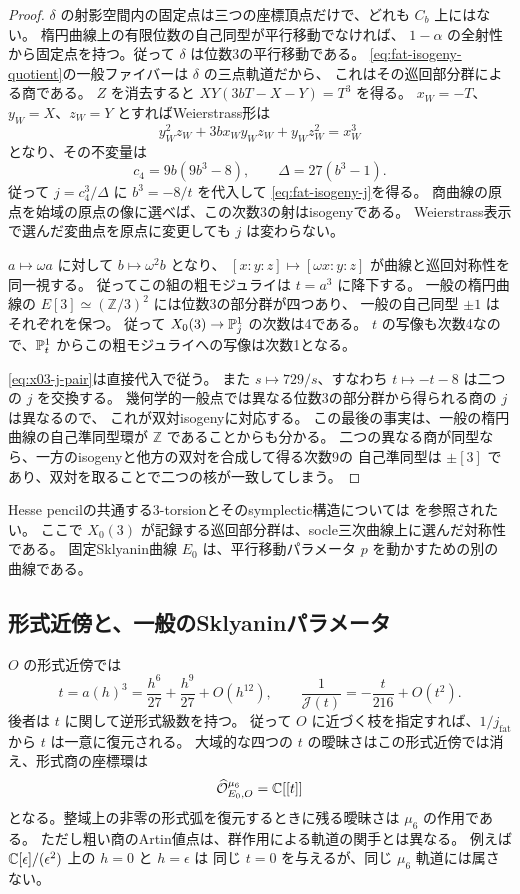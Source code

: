 \begin{proof}
$\delta$ の射影空間内の固定点は三つの座標頂点だけで、どれも $C_b$ 上にはない。
楕円曲線上の有限位数の自己同型が平行移動でなければ、
$1-\alpha$ の全射性から固定点を持つ。従って $\delta$ は位数3の平行移動である。
\eqref{eq:fat-isogeny-quotient}の一般ファイバーは $\delta$ の三点軌道だから、
これはその巡回部分群による商である。
$Z$ を消去すると $XY(3bT-X-Y)=T^3$ を得る。
$x_W=-T$、$y_W=X$、$z_W=Y$ とすればWeierstrass形は
\[
 y_W^2z_W+3b x_Wy_Wz_W+y_Wz_W^2=x_W^3
\]
となり、その不変量は
\[
 c_4=9b(9b^3-8),\qquad\Delta=27(b^3-1).
\]
従って $j=c_4^3/\Delta$ に $b^3=-8/t$ を代入して
\eqref{eq:fat-isogeny-j}を得る。
商曲線の原点を始域の原点の像に選べば、この次数3の射はisogenyである。
Weierstrass表示で選んだ変曲点を原点に変更しても $j$ は変わらない。

$a\mapsto\omega a$ に対して $b\mapsto\omega^2b$ となり、
$[x:y:z]\mapsto[\omega x:y:z]$ が曲線と巡回対称性を同一視する。
従ってこの組の粗モジュライは $t=a^3$ に降下する。
一般の楕円曲線の $E[3]\simeq(\mathbb Z/3)^2$ には位数3の部分群が四つあり、
一般の自己同型 $\pm1$ はそれぞれを保つ。
従って $X_0(3)\to\mathbb P^1_j$ の次数は4である。
$t$ の写像も次数4なので、$\mathbb P^1_t$ からこの粗モジュライへの写像は次数1となる。

\eqref{eq:x03-j-pair}は直接代入で従う。
また $s\mapsto729/s$、すなわち $t\mapsto-t-8$ は二つの $j$ を交換する。
幾何学的一般点では異なる位数3の部分群から得られる商の $j$ は異なるので、
これが双対isogenyに対応する。
この最後の事実は、一般の楕円曲線の自己準同型環が $\mathbb Z$ であることからも分かる。
二つの異なる商が同型なら、一方のisogenyと他方の双対を合成して得る次数9の
自己準同型は $\pm[3]$ であり、双対を取ることで二つの核が一致してしまう。
\end{proof}

Hesse pencilの共通する3-torsionとそのsymplectic構造については
\cite[Theorem 1.1 and Sections 2--4]{ATT}を参照されたい。
ここで $X_0(3)$ が記録する巡回部分群は、socle三次曲線上に選んだ対称性である。
固定Sklyanin曲線 $E_0$ は、平行移動パラメータ $p$ を動かすための別の曲線である。

\subsection{形式近傍と、一般のSklyaninパラメータ}

$O$ の形式近傍では
\[
 t=a(h)^3=\frac{h^6}{27}+\frac{h^9}{27}+O(h^{12}),\qquad
 \frac1{\mathcal J(t)}=-\frac{t}{216}+O(t^2).
\]
後者は $t$ に関して逆形式級数を持つ。
従って $O$ に近づく枝を指定すれば、$1/j_{\mathrm{fat}}$ から $t$ は一意に復元される。
大域的な四つの $t$ の曖昧さはこの形式近傍では消え、形式商の座標環は
\[
 \widehat{\mathcal O}_{E_0,O}^{\mu_6}=\mathbb C[[t]]
\]
となる。整域上の非零の形式弧を復元するときに残る曖昧さは $\mu_6$ の作用である。
ただし粗い商のArtin値点は、群作用による軌道の関手とは異なる。
例えば $\mathbb C[\epsilon]/(\epsilon^2)$ 上の $h=0$ と $h=\epsilon$ は
同じ $t=0$ を与えるが、同じ $\mu_6$ 軌道には属さない。

